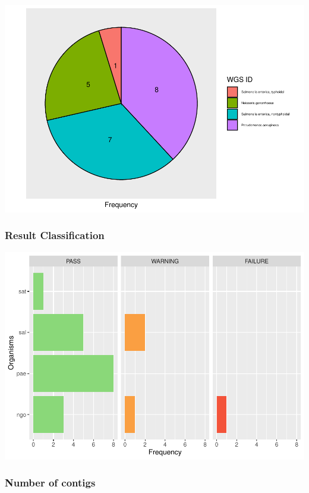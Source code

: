 \documentclass[
  a4paper,
]{article}
\begin{document}
\includegraphics{qualifyr_report_2024-07-23_files/figure-latex/pie_chart-1.pdf}

\subsubsection{Result Classification}\label{result-classification}

\includegraphics{qualifyr_report_2024-07-23_files/figure-latex/organism results-1.pdf}

\subsubsection{Number of contigs}\label{number-of-contigs}
\end{document}

